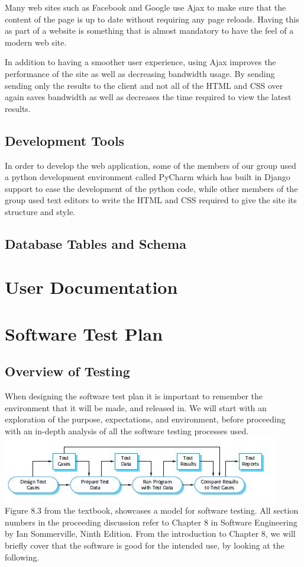 \documentclass[11pt]{article}
\begin{document}
Many web sites such as Facebook and Google use Ajax to make sure that
the content of the page is up to date without requiring any page
reloads. Having this as part of a website is something that is almost
mandatory to have the feel of a modern web site.

In addition to having a smoother user experience, using Ajax improves
the performance of the site as well as decreasing bandwidth usage. By
sending sending only the results to the client and not all of the HTML
and CSS over again saves bandwidth as well as decreases the time
required to view the latest results. 

\subsection{Development Tools}

In order to develop the web application, some of the members of our
group used a python development environment called PyCharm which has
built in Django support to ease the development of the python
code, while other members of the group used text editors to write the
HTML and CSS required to give the site its structure and style.


\subsection{Database Tables and Schema}

\section{User Documentation}

\section{Software Test Plan}
	\subsection{Overview of Testing}
		When designing the software test plan it is important to remember the environment that it will be made, and released in.
		We will start with an exploration of the purpose, expectations, and environment, before proceeding with an in-depth analysis of all the software testing processes used. \\
		\includegraphics[scale=0.75]{./images/testProcesses} \\
		Figure 8.3 from the textbook, showcases a model for software testing.
		All section numbers in the proceeding discussion refer to Chapter 8 in Software Engineering by Ian Sommerville, Ninth Edition.
		From the introduction to Chapter 8, we will briefly cover that the software is good for the intended use, by looking at the following.
\end{document}
